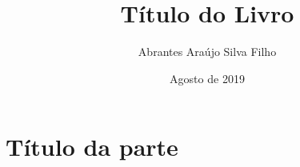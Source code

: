 \documentclass[pdftex, brazil, 12pt, twoside]{book}
\begin{document}
\frontmatter
\title{Título do Livro}
\author{Abrantes Araújo Silva Filho}
\date{Agosto de 2019}
\maketitle

\tableofcontents


\listoftables
\listoffigures


\mainmatter
\part{Título da parte}



\appendix



\backmatter


\printindex


\end{document}
